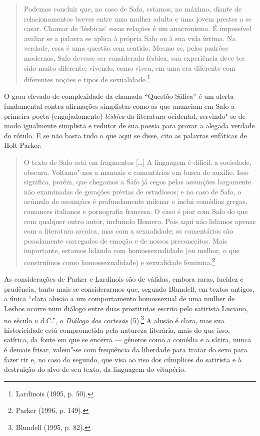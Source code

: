 \begin{quote}
Podemos concluir que, no caso de Safo, estamos, no máximo, diante de
relacionamentos breves entre uma mulher adulta e uma jovem prestes a se casar.
Chamar de ‘lésbicas’ essas relações é um anacronismo. É impossível avaliar se a
palavra se aplica à própria Safo ou à sua vida íntima. Na verdade, essa é uma
questão sem sentido. Mesmo se, pelos padrões modernos, Safo devesse ser
considerada lésbica, sua experiência deve ter sido muito diferente, vivendo,
como viveu, em uma era diferente com diferentes noções e tipos de sexualidade.\footnote{ Lardinois (1995, p. 50).}
\end{quote}

O grau elevado de complexidade da chamada “Questão Sáfica” é um alerta
fundamental contra afirmações simplistas como as que anunciam em Safo a
primeira poeta (engajadamente) \textit{lésbica} da literatura ocidental,
servindo"-se de modo igualmente simplista e redutor de sua poesia para provar a alegada
verdade do rótulo. E se não basta tudo o que aqui se disse, cito as palavras
enfáticas de Holt Parker: 

\begin{quote}
O texto de Safo está em fragmentos [\ldots{}] A linguagem é difícil, a sociedade,
obscura. Voltamo"-nos a manuais e comentários em busca de auxílio. Isso
significa, porém, que chegamos a Safo já cegos pelas assunções largamente não
examinadas de gerações prévias de estudiosos; e no caso de Safo, o acúmulo de
assunções é profundamente milenar e inclui comédias gregas, romances italianos
e pornografia francesa. O caso é pior com Safo do que com qualquer outro autor,
incluindo Homero. Pois aqui não lidamos apenas com a literatura arcaica, mas
com a sexualidade; os comentários são pesadamente carregados de emoção e de
nossos preconceitos. Mais importante, estamos lidando com homossexualidade (ou
melhor, o que construímos como homossexualidade) e sexualidade feminina.\footnote{ Parker (1996, p. 149).}
\end{quote}

As considerações de Parker e Lardinois são de válidas, embora raras, lucidez e
prudência, tanto mais se considerarmos que, segundo Blundell, em
textos antigos, a única “clara alusão a um comportamento homossexual de uma
mulher de Lesbos ocorre num diálogo entre duas prostitutas escrito pelo
satirista Luciano, no século \textsc{ii} d.C.”, o \textit{Diálogo das cortesãs}
(5).\footnote{ Blundell (1995, p. 82).} A
alusão é clara, mas sua historicidade está comprometida pela natureza
literária, mais do que isso, satírica, da fonte em que se encerra --- gêneros como a
comédia e a sátira, nunca é demais frisar, valem"-se com frequência da liberdade
para tratar do sexo para fazer rir e, no caso do segundo, que visa ao riso dos
cúmplices do satirista e à destruição do alvo de seu texto, da linguagem do
vitupério. 

